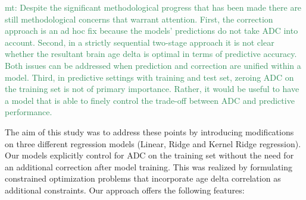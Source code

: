\documentclass[utf8]{frontiersSCNS} %
\newcommand{\mt}[1]{\textcolor{SeaGreen}{mt: #1}}
\begin{document}
\mt{Despite the significant methodological progress that has been made there are still methodological concerns that warrant attention. First, the correction approach is an ad hoc fix because the models' predictions do not take ADC into account. Second, in a strictly sequential two-stage approach it is not clear whether the resultant brain age delta is optimal in terms of predictive accuracy. Both issues can be addressed when prediction and correction are unified within a model. Third, in predictive settings with training and test set, zeroing ADC on the training set is not of primary importance. 
Rather, it would be useful to have a model that is able to finely control the trade-off between ADC and predictive performance.} 

The aim of this study was to address these points by introducing modifications on three different regression models (Linear, Ridge and Kernel Ridge regression). Our models explicitly control for ADC on the training set without the need for an additional correction after model training. This was realized by formulating constrained optimization problems that incorporate age delta correlation as additional constraints. Our approach offers the following features: 
\end{document}
